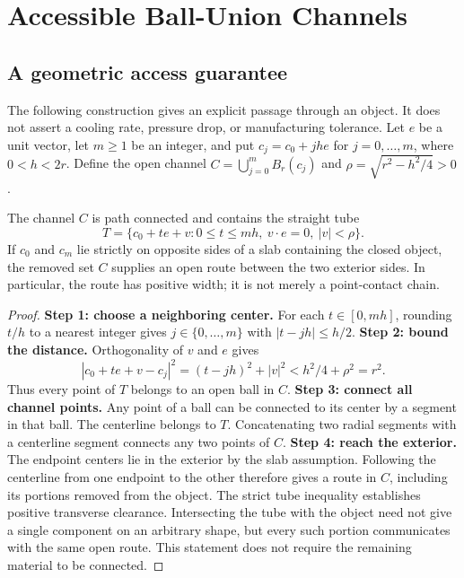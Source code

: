 \section{Accessible Ball-Union Channels}
\label{app:accessible}

\subsection{A geometric access guarantee}
The following construction gives an explicit passage through an object.
It does not assert a cooling rate, pressure drop, or manufacturing tolerance.
Let $e$ be a unit vector, let $m\geq1$ be an integer, and put
$c_j=c_0+jhe$ for $j=0,\ldots,m$, where $0<h<2r$. Define the open channel
$C=\bigcup_{j=0}^m B_r(c_j)$ and
$\rho=\sqrt{r^2-h^2/4}>0$.

\begin{proposition}
\label{prop:channelcore}
The channel $C$ is path connected and contains the straight tube
\[
 T=\{c_0+te+v:0\leq t\leq mh,\ v\cdot e=0,\ |v|<\rho\}.
\]
If $c_0$ and $c_m$ lie strictly on opposite sides of a slab containing
the closed object, the removed set $C$ supplies an open route between
the two exterior sides. In particular, the route has positive width;
it is not merely a point-contact chain.
\end{proposition}
\begin{proof}
\textbf{Step 1: choose a neighboring center.}
For each $t\in[0,mh]$, rounding $t/h$ to a nearest integer gives
$j\in\{0,\ldots,m\}$ with $|t-jh|\leq h/2$.
\textbf{Step 2: bound the distance.}
Orthogonality of $v$ and $e$ gives
\[
 |c_0+te+v-c_j|^2=(t-jh)^2+|v|^2
 <h^2/4+\rho^2=r^2.
\]
Thus every point of $T$ belongs to an open ball in $C$.
\textbf{Step 3: connect all channel points.}
Any point of a ball can be connected to its center by a segment in that
ball. The centerline belongs to $T$. Concatenating two radial segments
with a centerline segment connects any two points of $C$.
\textbf{Step 4: reach the exterior.}
The endpoint centers lie in the exterior by the slab assumption.
Following the centerline from one endpoint to the other therefore
gives a route in $C$, including its portions removed from the object.
The strict tube inequality establishes positive transverse clearance.
Intersecting the tube with the object need not give a single component
on an arbitrary shape, but every such portion communicates with the
same open route. This statement does not require the remaining material
to be connected.
\end{proof}

